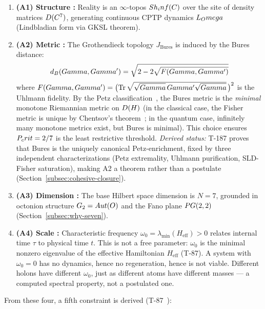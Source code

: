 \begin{enumerate}[leftmargin=2em]
  \item \textbf{(A1) Structure :} Reality is an $\infty$-topos $Sh_inf(C)$ over
        the site of density matrices $D(C^7)$, generating continuous CPTP
        dynamics $L_Omega$ (Lindbladian form via GKSL theorem).
  \item \textbf{(A2) Metric :} The Grothendieck topology $J_{\mathrm{Bures}}$ is induced
        by the Bures distance:
        \begin{equation}
          d_B(Gamma, Gamma') = \sqrt{2 - 2\sqrt{F(Gamma, Gamma')}}
          \label{eq:bures}
        \end{equation}
        where $F(Gamma, Gamma') = \bigl(\Tr\sqrt{\sqrt{Gamma}\,Gamma'\sqrt{Gamma}}\,\bigr)^2$
        is the Uhlmann fidelity. By the Petz classification~\cite{petz1996}, the Bures metric is the
        \emph{minimal} monotone Riemannian metric on $D(H)$
        (in the classical case, the Fisher metric is unique by
        Chentsov's theorem~\cite{chentsov1982}; in the quantum case,
        infinitely many monotone metrics exist, but Bures is minimal).
        This choice ensures $P_crit = 2/7$ is the least restrictive threshold.
        \emph{Derived status:} T-187 proves that Bures is the uniquely canonical
        Petz-enrichment, fixed by three independent characterizations (Petz extremality,
        Uhlmann purification, SLD-Fisher saturation), making A2 a theorem rather
        than a postulate (Section~\ref{subsec:cohesive-closure}).
  \item \textbf{(A3) Dimension :} The base Hilbert space dimension is $N = 7$, grounded
        in octonion structure $G_2 = Aut(O)$ and the Fano plane $PG(2,2)$
        (Section~\ref{subsec:why-seven}).
  \item \textbf{(A4) Scale :} Characteristic frequency
        $\omega_0 = \lambda_{\min}(H_{\mathrm{eff}}) > 0$ relates internal time $\tau$ to
        physical time $t$. This is not a free parameter: $\omega_0$ is the minimal nonzero
        eigenvalue of the effective Hamiltonian $H_{\mathrm{eff}}$ (T-87). A system with
        $\omega_0 = 0$ has no dynamics, hence no regeneration, hence is not viable. Different
        holons have different $\omega_0$, just as different atoms have different masses ---
        a computed spectral property, not a postulated one.
\end{enumerate}

From these four, a fifth constraint is derived (T-87~):

